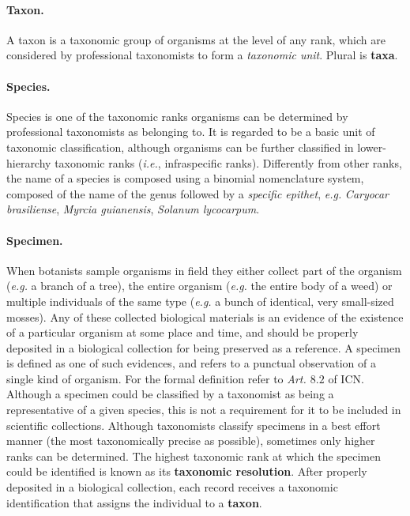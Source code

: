 \paragraph*{Taxon.}
A taxon is a taxonomic group of organisms at the level of any rank, which are considered by professional taxonomists to form a \textit{taxonomic unit}. Plural is \textbf{taxa}.

\paragraph*{Species.} %
Species is one of the taxonomic ranks organisms can be determined by professional taxonomists as belonging to. It is regarded to be a basic unit of taxonomic classification, although organisms can be further classified in lower-hierarchy taxonomic ranks (\textit{i.e.}, infraspecific ranks).
Differently from other ranks, the name of a species is composed using a binomial nomenclature system, composed of the name of the genus followed by a \textit{specific epithet}, \textit{e.g.} \textit{Caryocar brasiliense}, \textit{Myrcia guianensis}, \textit{Solanum lycocarpum}.

\paragraph*{Specimen.}
When botanists sample organisms in field they either collect part of the organism (\textit{e.g.} a branch of a tree), the entire organism (\textit{e.g.} the entire body of a weed) or multiple individuals of the same type (\textit{e.g.} a bunch of identical, very small-sized mosses). 
Any of these collected biological materials is an evidence of the existence of a particular organism at some place and time, and should be properly deposited in a biological collection for being preserved as a reference. 
A specimen is defined as one of such evidences, and refers to a punctual observation of a single kind of organism. 
For the formal definition refer to \textit{Art. $8.2$} of ICN. 
Although a specimen could be classified by a taxonomist as being a representative of a given species, this is not a requirement for it to be included in scientific collections. Although taxonomists classify specimens in a best effort manner (the most taxonomically precise as possible), sometimes only higher ranks can be determined. The highest taxonomic rank at which the specimen could be identified is known as its \textbf{taxonomic resolution}.
After properly deposited in a biological collection, each record receives a taxonomic identification that assigns the individual to a \textbf{taxon}.







